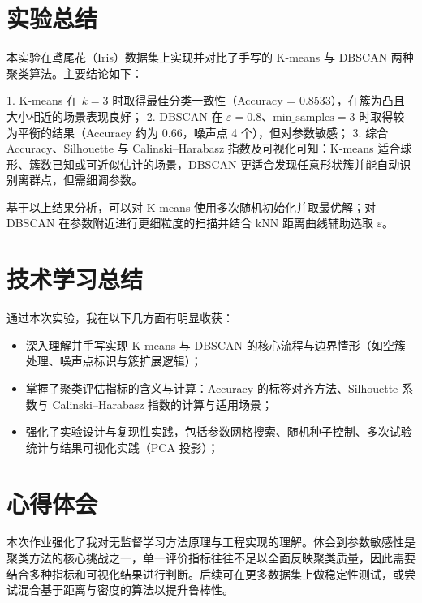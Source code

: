 \section{实验总结}
本实验在鸢尾花（Iris）数据集上实现并对比了手写的 K-means 与 DBSCAN 两种聚类算法。主要结论如下：

1. K-means 在 $k=3$ 时取得最佳分类一致性（Accuracy = 0.8533），在簇为凸且大小相近的场景表现良好；
2. DBSCAN 在 $\varepsilon=0.8$、$\mathrm{min\_samples}=3$ 时取得较为平衡的结果（Accuracy 约为 0.66，噪声点 4 个），但对参数敏感；
3. 综合 Accuracy、Silhouette 与 Calinski–Harabasz 指数及可视化可知：K-means 适合球形、簇数已知或可近似估计的场景，DBSCAN 更适合发现任意形状簇并能自动识别离群点，但需细调参数。

基于以上结果分析，可以对 K-means 使用多次随机初始化并取最优解；对 DBSCAN 在参数附近进行更细粒度的扫描并结合 kNN 距离曲线辅助选取 $\varepsilon$。

\section{技术学习总结}
通过本次实验，我在以下几方面有明显收获：
\begin{itemize}
    \item 深入理解并手写实现 K-means 与 DBSCAN 的核心流程与边界情形（如空簇处理、噪声点标识与簇扩展逻辑）；
    \item 掌握了聚类评估指标的含义与计算：Accuracy 的标签对齐方法、Silhouette 系数与 Calinski–Harabasz 指数的计算与适用场景；
    \item 强化了实验设计与复现性实践，包括参数网格搜索、随机种子控制、多次试验统计与结果可视化实践（PCA 投影）；
\end{itemize}

\section{心得体会}
本次作业强化了我对无监督学习方法原理与工程实现的理解。体会到参数敏感性是聚类方法的核心挑战之一，单一评价指标往往不足以全面反映聚类质量，因此需要结合多种指标和可视化结果进行判断。后续可在更多数据集上做稳定性测试，或尝试混合基于距离与密度的算法以提升鲁棒性。

